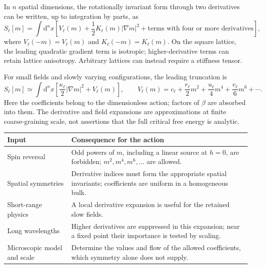 \documentclass[11pt]{article}
\newcommand{\dd}{\mathrm{d}}
\begin{document}
In \(n\) spatial dimensions, the rotationally invariant form through two
derivatives can be written, up to integration by parts, as
\begin{equation}
S_\ell[m]=\int\dd^n x\left[
V_\ell(m)+\frac12K_\ell(m)|\nabla m|^2
+\text{terms with four or more derivatives}\right],
\label{eq:generalLandau}
\end{equation}
where \(V_\ell(-m)=V_\ell(m)\) and \(K_\ell(-m)=K_\ell(m)\).
On the square lattice, the leading quadratic gradient term is isotropic;
higher-derivative terms can retain lattice anisotropy. Arbitrary lattices
can instead require a stiffness tensor.

For small fields and slowly varying configurations, the leading truncation is
\begin{equation}
\boxed{S_\ell[m]\simeq\int\dd^n x\left[
\frac{\kappa_\ell}{2}|\nabla m|^2+V_\ell(m)\right],\qquad
V_\ell(m)=c_\ell+\frac{r_\ell}{2}m^2+\frac{u_\ell}{4}m^4
+\frac{v_\ell}{6}m^6+\cdots.}
\label{eq:LG}
\end{equation}
Here the coefficients belong to the dimensionless action; factors of
\(\beta\) are absorbed into them. The derivative and field expansions are
approximations at finite coarse-graining scale, not assertions that the
full critical free energy is analytic.

\begin{center}
\small
\renewcommand{\arraystretch}{1.2}
\begin{tabular}{@{}>{\raggedright\arraybackslash}p{}>{\raggedright\arraybackslash}p{}@{}}
\toprule
Input & Consequence for the action \\
\midrule
Spin reversal & Odd powers of \(m\), including a linear source at \(h=0\),
are forbidden; \(m^2,m^4,m^6,\ldots\) are allowed. \\
Spatial symmetries & Derivative indices must form the appropriate spatial
invariants; coefficients are uniform in a homogeneous bulk. \\
Short-range physics & A local derivative expansion is useful for the
retained slow fields. \\
Long wavelengths & Higher derivatives are suppressed in this expansion;
near a fixed point their importance is tested by scaling. \\
Microscopic model and scale & Determine the values and flow of the allowed
coefficients, which symmetry alone does not supply. \\
\bottomrule
\end{tabular}
\end{center}
\end{document}

